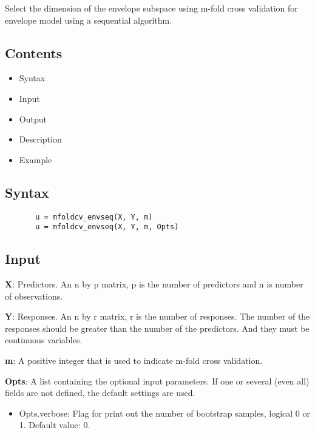 \documentclass[a4paper,11pt,openany]{memoir}
\begin{document}
\begin{par}
Select the dimension of the envelope subspace using m-fold cross validation for envelope model using a sequential algorithm.
\end{par} \vspace{1em}

\subsection*{Contents}

\begin{itemize}
\setlength{\itemsep}{-1ex}
   \item Syntax
   \item Input
   \item Output
   \item Description
   \item Example
\end{itemize}


\subsection*{Syntax}


\begin{verbatim}       u = mfoldcv_envseq(X, Y, m)
       u = mfoldcv_envseq(X, Y, m, Opts)\end{verbatim}
    

\subsection*{Input}

\begin{par}
\textbf{X}: Predictors. An n by p matrix, p is the number of predictors and n is number of observations.
\end{par} \vspace{1em}
\begin{par}
\textbf{Y}: Responses. An n by r matrix, r is the number of responses. The number of the responses should be greater than the number of the predictors. And they must be continuous variables.
\end{par} \vspace{1em}
\begin{par}
\textbf{m}: A positive integer that is used to indicate m-fold cross validation.
\end{par} \vspace{1em}
\begin{par}
\textbf{Opts}: A list containing the optional input parameters. If one or several (even all) fields are not defined, the default settings are used.
\end{par} \vspace{1em}
\begin{itemize}
\setlength{\itemsep}{-1ex}
   \item Opts.verbose: Flag for print out the number of bootstrap samples, logical 0 or 1. Default value: 0.
\end{itemize}
\end{document}
